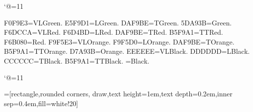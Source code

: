 \catcode`@=11\relax
\def\Api{Mathematicon@Api}%




\DefineRGBcolor F0F9E3=VLGreen.
\DefineRGBcolor E5F9D1=LGreen.
\DefineRGBcolor DAF9BE=TGreen.
\DefineRGBcolor 5DA93B=Green.
\DefineRGBcolor F6DCCA=VLRed.
\DefineRGBcolor F6D4BD=LRed.
\DefineRGBcolor DAF9BE=TRed.
\DefineRGBcolor B5F9A1=TTRed.
\DefineRGBcolor F6B080=Red.
\DefineRGBcolor F9F5E3=VLOrange.
\DefineRGBcolor F9F5D0=LOrange.
\DefineRGBcolor DAF9BE=TOrange.
\DefineRGBcolor B5F9A1=TTOrange.
\DefineRGBcolor D7A93B=Orange.
\DefineRGBcolor EEEEEE=VLBlack.
\DefineRGBcolor DDDDDD=LBlack.
\DefineRGBcolor CCCCCC=TBlack.
\DefineRGBcolor B5F9A1=TTBlack.
=Black.


\catcode`@=11\relax



\vglue-10mm
\bigskip
\bigskip

=[rectangle,rounded corners, draw,text height=1em,text depth=0.2em,inner sep=0.4em,fill=white!20]

